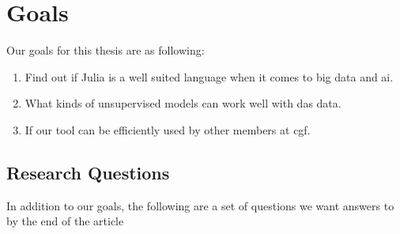 \section{Goals}

Our goals for this thesis are as following: 

\begin{enumerate}
    \item Find out if Julia is a well suited  language when it comes to big data and \acrshort{ai}.
    \item What kinds of unsupervised models can work well with \acrshort{das} data.
    \item If our tool can be efficiently used by other members at \acrshort{cgf}.
\end{enumerate}


\subsection{Research Questions}

In addition to our goals, the following are a set of questions we want answers to by the end of the article
